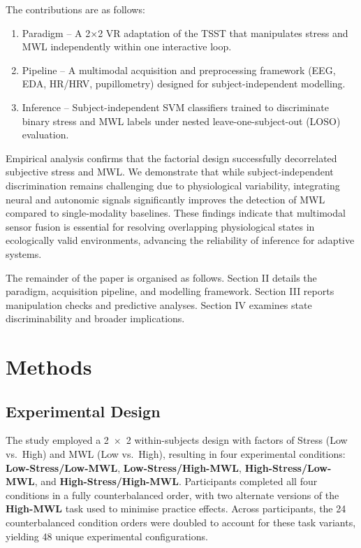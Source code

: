 \documentclass[lettersize,journal]{IEEEtran}
\begin{document}
The contributions are as follows:

\begin{enumerate}
\item Paradigm – A 2×2 VR adaptation of the TSST that manipulates stress and MWL independently within one interactive loop.

\item Pipeline – A multimodal acquisition and preprocessing framework (EEG, EDA, HR/HRV, pupillometry) designed for subject-independent modelling.

\item Inference – Subject-independent SVM classifiers trained to discriminate binary stress and MWL labels under nested leave-one-subject-out (LOSO) evaluation.

\end{enumerate}

Empirical analysis confirms that the factorial design successfully decorrelated subjective stress and MWL. We demonstrate that while subject-independent discrimination remains challenging due to physiological variability, integrating neural and autonomic signals significantly improves the detection of MWL compared to single-modality baselines. These findings indicate that multimodal sensor fusion is essential for resolving overlapping physiological states in ecologically valid environments, advancing the reliability of inference for adaptive systems.

The remainder of the paper is organised as follows. Section II details the paradigm, acquisition pipeline, and modelling framework. Section III reports manipulation checks and predictive analyses. Section IV examines state discriminability and broader implications.


\section{Methods}


\subsection{Experimental Design}
The study employed a 2~\(\times\)~2 within-subjects design with factors of Stress (Low vs.\ High) and MWL (Low vs.\ High), resulting in four experimental conditions: \textbf{Low-Stress/Low-MWL}, \textbf{Low-Stress/High-MWL}, 
\textbf{High-Stress/Low-MWL}, and \textbf{High-Stress/High-MWL}.
 Participants completed all four conditions in a fully counterbalanced order, with two alternate versions of the \textbf{High-MWL} task used to minimise practice effects. Across participants, the 24 counterbalanced condition orders were doubled to account for these task variants, yielding 48 unique experimental configurations.
\end{document}

